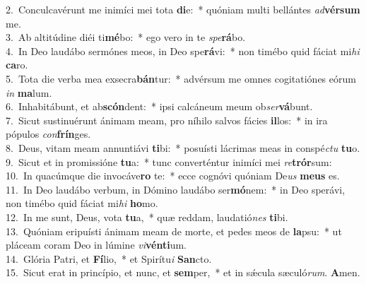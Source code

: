 {2.~}Conculcavérunt me inimíci mei tota \textbf{di}e:~* quóniam multi bellántes \textit{ad}\textbf{vér}\textbf{sum} me.\\
{3.~}Ab altitúdine diéi ti\textbf{mé}bo:~* ego vero in te \textit{spe}\textbf{rá}bo.\\
{4.~}In Deo laudábo sermónes meos, in Deo spe\textbf{rá}vi:~* non timébo quid fáciat mi\textit{hi} \textbf{ca}ro.\\
{5.~}Tota die verba mea exsecra\textbf{bán}tur:~* advérsum me omnes cogitatiónes eórum \textit{in} \textbf{ma}lum.\\
{6.~}Inhabitábunt, et ab\textbf{scón}dent:~* ipsi calcáneum meum ob\textit{ser}\textbf{vá}bunt.\\
{7.~}Sicut sustinuérunt ánimam meam, pro níhilo salvos fácies \textbf{il}los:~* in ira pópulos \textit{con}\textbf{frín}ges.\\
{8.~}Deus, vitam meam annuntiávi \textbf{ti}bi:~* posuísti lácrimas meas in conspé\textit{ctu} \textbf{tu}o.\\
{9.~}Sicut et in promissióne \textbf{tu}a:~* tunc converténtur inimíci mei \textit{re}\textbf{trór}sum:\\
{10.~}In quacúmque die invocáve\textbf{ro} te:~* ecce cognóvi quóniam De\textit{us} \textbf{me}\textbf{us} es.\\
{11.~}In Deo laudábo verbum, in Dómino laudábo ser\textbf{mó}nem:~* in Deo sperávi, non timébo quid fáciat mi\textit{hi} \textbf{ho}mo.\\
{12.~}In me sunt, Deus, vota \textbf{tu}a,~* quæ reddam, laudatió\textit{nes} \textbf{ti}bi.\\
{13.~}Quóniam eripuísti ánimam meam de morte, et pedes meos de \textbf{la}psu:~* ut pláceam coram Deo in lúmine \textit{vi}\textbf{vén}\textbf{ti}um.\\
{14.~}Glória Patri, et \textbf{Fí}lio,~* et Spirítu\textit{i} \textbf{San}cto.\\
{15.~}Sicut erat in princípio, et nunc, et \textbf{sem}per,~* et in sǽcula sæculó\textit{rum}. \textbf{A}men.\\
